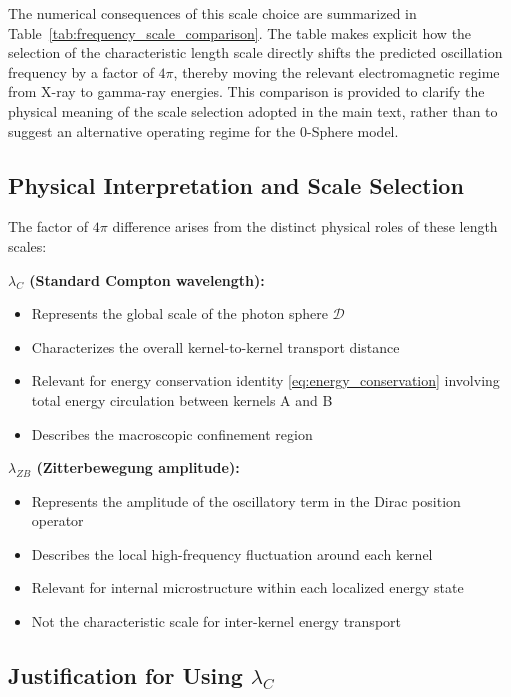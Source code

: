 \documentclass[%
 reprint,
 amsmath,amssymb,
 aps,
 prb,
]{revtex4-2}
\numberwithin{equation}{section}
\begin{document}
The numerical consequences of this scale choice are summarized in Table~\ref{tab:frequency_scale_comparison}.
The table makes explicit how the selection of the characteristic length scale directly shifts the predicted oscillation frequency by a factor of $4\pi$, thereby moving the relevant electromagnetic regime from X-ray to gamma-ray energies.
This comparison is provided to clarify the physical meaning of the scale selection adopted in the main text, rather than to suggest an alternative operating regime for the 0-Sphere model.


\subsection{Physical Interpretation and Scale Selection}

The factor of $4\pi$ difference arises from the distinct physical roles of these length scales:

\medskip
\noindent\textbf{$\lambda_C$ (Standard Compton wavelength):}
\begin{itemize}
\item Represents the global scale of the photon sphere $\mathcal{D}$
\item Characterizes the overall kernel-to-kernel transport distance
\item Relevant for energy conservation identity \eqref{eq:energy_conservation} involving total energy circulation between kernels A and B
\item Describes the macroscopic confinement region
\end{itemize}

\medskip
\noindent\textbf{$\lambda_{ZB}$ (Zitterbewegung amplitude):}
\begin{itemize}
\item Represents the amplitude of the oscillatory term in the Dirac position operator
\item Describes the local high-frequency fluctuation around each kernel
\item Relevant for internal microstructure within each localized energy state
\item Not the characteristic scale for inter-kernel energy transport
\end{itemize}

\subsection{Justification for Using $\lambda_C$}
\end{document}
